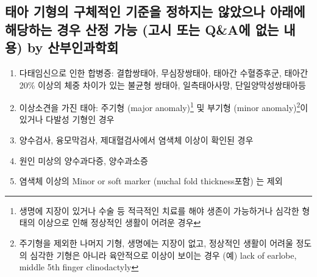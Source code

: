 \subsection{태아 기형의 구체적인 기준을 정하지는 않았으나 아래에 해당하는 경우 산정 가능 (고시 또는 \textsf{Q\&A}에 없는 내용) by 산부인과학회}
\begin{minipage}{.95\textwidth}
\begin{enumerate}[①]\tightlist
	\item 다태임신으로 인한 합병증: 결합쌍태아, 무심장쌍태아, 태아간 수혈증후군, 태아간 20\% 이상의 체중 차이가 있는 불균형 쌍태아, 일측태아사망, 단일양막성쌍태아등
	\item 이상소견을 가진 태아: 주기형 (major anomaly)\footnote{생명에 지장이 있거나 수술 등 적극적인 치료를 해야 생존이 가능하거나 심각한 형태의 이상으로 인해 정상적인 생활이 어려운 경우} 및 부기형 (minor anomaly)\footnote{주기형을 제외한 나머지 기형, 생명에는 지장이 없고, 정상적인 생활이 어려울 정도의 심각한 기형은 아니라 육안적으로 이상이 보이는 경우 (예) lack of earlobe, middle 5th finger clinodactyly}이 있거나 다발성 기형인 경우
	\item 양수검사, 융모막검사, 제대혈검사에서 염색체 이상이 확인된 경우
	\item 원인 미상의 양수과다증, 양수과소증
	\item 염색체 이상의 Minor or soft marker (nuchal fold thickness포함) 는 제외
\end{enumerate}
\end{minipage}
\prezi{\clearpage}
